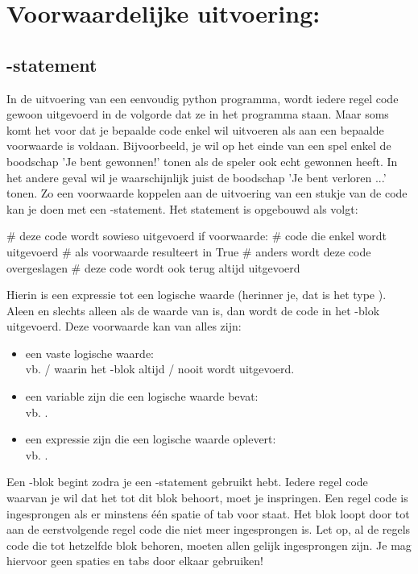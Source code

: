\section{Voorwaardelijke uitvoering: }
\label{sec:voorwaardelijke-uitvoering}

\subsection{-statement}

In de uitvoering van een eenvoudig python programma,
wordt iedere regel code gewoon uitgevoerd in de volgorde dat ze in het programma staan.
Maar soms komt het voor dat je bepaalde code enkel wil uitvoeren als aan een bepaalde voorwaarde is voldaan.
Bijvoorbeeld, je wil op het einde van een spel enkel de boodschap 'Je bent gewonnen!' tonen als de speler ook echt gewonnen heeft.
In het andere geval wil je waarschijnlijk juist de boodschap 'Je bent verloren ...' tonen.
Zo een voorwaarde koppelen aan de uitvoering van een stukje van de code kan je doen met een -statement.
Het statement is opgebouwd als volgt:
\begin{pyEnv}
# deze code wordt sowieso uitgevoerd
if voorwaarde:
	# code die enkel wordt uitgevoerd
	# als voorwaarde resulteert in True
	# anders wordt deze code overgeslagen
# deze code wordt ook terug altijd uitgevoerd
\end{pyEnv}
Hierin is  een expressie tot een logische waarde (herinner je, dat is het type \booleantype).
Aleen en slechts alleen als de waarde van  \true is, dan wordt de code in het -blok uitgevoerd.
Deze voorwaarde kan van alles zijn:
\begin{itemize}
	\item
		een vaste logische waarde: \\
		vb.  /  waarin het -blok altijd / nooit wordt uitgevoerd.
	\item
		een variable zijn die een logische waarde bevat: \\
		vb. .
	\item een expressie zijn die een logische waarde oplevert: \\
		vb. .
\end{itemize}
Een -blok begint zodra je een -statement gebruikt hebt.
Iedere regel code waarvan je wil dat het tot dit blok behoort, moet je inspringen.
Een regel code is ingesprongen als er minstens één spatie of tab voor staat.
Het blok loopt door tot aan de eerstvolgende regel code die niet meer ingesprongen is.
Let op, al de regels code die tot hetzelfde blok behoren, moeten allen gelijk ingesprongen zijn.
Je mag hiervoor geen spaties en tabs door elkaar gebruiken!

